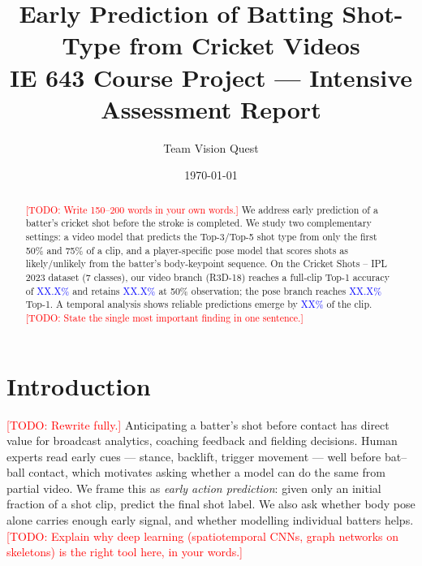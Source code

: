 \documentclass[11pt]{article}
\title{\textbf{Early Prediction of Batting Shot-Type from Cricket Videos}\\
\large IE 643 Course Project --- Intensive Assessment Report}
\author{Team Vision Quest \\ \TODO{Member 1 Name (Roll No.)} \and \TODO{Member 2 Name (Roll No.)}}
\date{\today}
\newcommand{\TODO}[1]{\textcolor{red}{[TODO: #1]}}
\newcommand{\NUM}[1]{\textcolor{blue}{#1}}   %
\begin{document}
\maketitle

\begin{abstract}
\TODO{Write 150--200 words in your own words.} We address early prediction of a
batter's cricket shot before the stroke is completed. We study two complementary
settings: a video model that predicts the Top-3/Top-5 shot type from only the
first 50\% and 75\% of a clip, and a player-specific pose model that scores shots
as likely/unlikely from the batter's body-keypoint sequence. On the
Cricket Shots -- IPL 2023 dataset (7 classes), our video branch
(R3D-18) reaches a full-clip Top-1 accuracy of \NUM{XX.X\%} and retains
\NUM{XX.X\%} at 50\% observation; the pose branch reaches \NUM{XX.X\%} Top-1.
A temporal analysis shows reliable predictions emerge by \NUM{XX\%} of the clip.
\TODO{State the single most important finding in one sentence.}
\end{abstract}

\section{Introduction}
\TODO{Rewrite fully.} Anticipating a batter's shot before contact has direct value
for broadcast analytics, coaching feedback and fielding decisions. Human experts
read early cues --- stance, backlift, trigger movement --- well before bat--ball
contact, which motivates asking whether a model can do the same from partial
video. We frame this as \emph{early action prediction}: given only an initial
fraction of a shot clip, predict the final shot label. We also ask whether body
pose alone carries enough early signal, and whether modelling individual batters
helps. \TODO{Explain why deep learning (spatiotemporal CNNs, graph networks on
skeletons) is the right tool here, in your words.}

\end{document}
